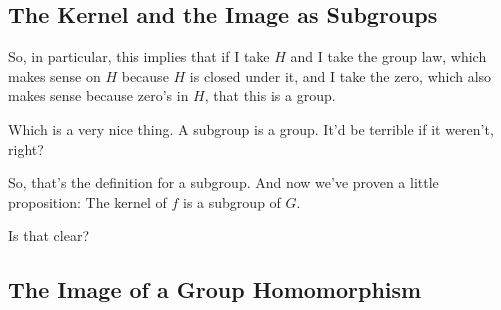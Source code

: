 \documentclass[11pt,a4paper]{report}
\makeatletter
\newif\ifinsideproof
\theoremstyle{purplethm}
\newtheorem{proposition}[theorem]{Proposition}
\theoremstyle{defthm}
\theoremstyle{examplethm}
\theoremstyle{remarkthm}
\theoremstyle{questionthm}
\theoremstyle{importantremarkthm}
\theoremstyle{purplethm}
\renewenvironment{proof}[1][Proof]{
    \par\addvspace{2ex plus 0.5ex minus 0.2ex}
    \insideprooftrue 
    \noindent\textcolor{ProofTint}{\faPenNib}\hspace{0.5em}%
    {\normalfont\sffamily\bfseries\color{ProofTint}#1}%
    \par\nobreak\vspace{1ex plus .2ex}\vspace{-\parskip}
    \@afterindentfalse\@afterheading
}{
    \par\vspace{-2ex}\hfill 
    \tikz[baseline=(Q.base)]\node[draw=ProofTint, fill=ProofQEDBg, line width=1pt, rounded corners=2pt, inner xsep=4pt, inner ysep=2pt, font=\sffamily\bfseries\small, text=ProofQEDText, drop shadow={shadow xshift=0.5ex, shadow yshift=-0.5ex, fill=ProofTint, opacity=0.4}] (Q) {Q.E.D.};
    \par\vspace{2ex}
}
\makeatother
\begin{document}
\subsection{The Kernel and the Image as Subgroups}

\begin{speech}[00:26:00 - 00:26:50]
So, in particular, this implies that if I take $H$ and I take the group law, which makes sense on $H$ because $H$ is closed under it, and I take the zero, which also makes sense because zero's in $H$, that this is a group.

Which is a very nice thing. A subgroup is a group. It'd be terrible if it weren't, right?

So, that's the definition for a subgroup. And now we've proven a little proposition: The kernel of $f$ is a subgroup of $G$.

Is that clear?
\end{speech}


\subsection{The Image of a Group Homomorphism}
\end{document}

